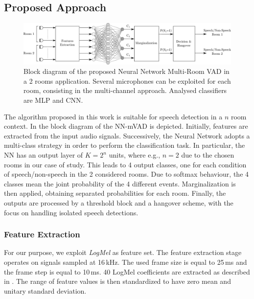\subsection{Proposed Approach}
\begin{figure}[h]
	\centering
	\includegraphics[width=\textwidth]{img/flowchart_VAD}
	\caption[Multiroom VAD with 3-D CNNs]{Block diagram of the proposed Neural Network Multi-Room VAD in a 2 rooms application. 
		Several microphones can be exploited for each room, consisting in the multi-channel approach. Analysed classifiers are MLP and CNN.}
	\label{fig:VAD}
\end{figure}

The algorithm proposed in this work is suitable for speech detection in a $n$ room context. 
In  the block diagram of the NN-mVAD is depicted. 
Initially, features are extracted from the input audio signals. 
Successively, the Neural Network adopts a multi-class strategy in order to perform the classification task. In particular, the NN has an output layer of $K=2^{n}$ units,
where e.g., $n=2$ due to the chosen rooms in our case of study. This leads to 4 output classes, one for each condition of speech/non-speech in the 2 considered rooms. Due to softmax behaviour, the 4 classes mean the joint probability of the 4 different events.
Marginalization is then applied, obtaining separated probabilities for each room. Finally, the outputs are processed by a threshold block and a hangover scheme, with the focus on handling isolated speech detections.

\subsubsection{Feature Extraction}
\label{ssec:feat_desc}
For our purpose, we exploit \textit{LogMel} as feature set.
The feature extraction stage operates on signals sampled at 16\,kHz. The used frame size is equal to 25\,ms and the frame step is equal to 10\,ms. 40 LogMel coefficients are extracted as described in . The range of feature values is then standardized to have zero mean and unitary standard deviation.

